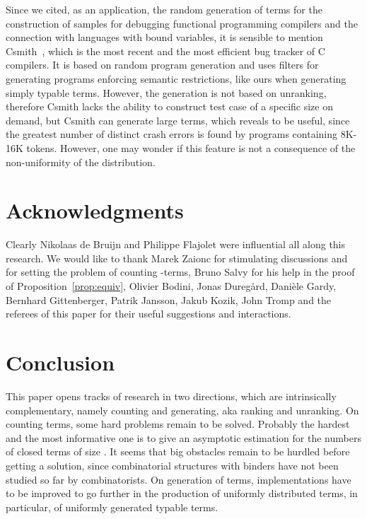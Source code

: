 \documentclass{jfp1}
\begin{document}
  Since we cited, as an application, the random generation of terms for the
  construction of samples for debugging functional programming compilers and the
  connection with languages with bound variables, it is sensible to mention
  \textsf{Csmith}~\cite{DBLP:conf/pldi/YangCER11}, which is the most recent and the
  most efficient bug tracker of C compilers.  It is based on random program
  generation and uses filters for generating programs enforcing semantic
  restrictions, like ours when generating simply typable terms.  However, the generation
  is not based on unranking, therefore \textsf{Csmith} lacks the ability to construct
  test case of a specific size on demand, but \textsf{Csmith} can generate large
  terms, which reveals to be useful, since the greatest number of distinct crash
  errors is found by programs containing 8K-16K tokens. However, one may wonder if
  this feature is not a consequence of the non-uniformity of the distribution.

\section{Acknowledgments}
\label{sec:acknowledgments}

Clearly Nikolaas de Bruijn and  Philippe Flajolet were influential all along this research.  We would like to
thank Marek Zaionc for stimulating discussions and for setting the problem of
counting -terms, Bruno Salvy for his help in the proof of
Proposition~\ref{prop:equiv}, Olivier Bodini, Jonas Dureg{\aa}rd, Dani\`{e}le Gardy,
Bernhard Gittenberger, Patrik Jansson, Jakub Kozik, John Tromp and the referees of this paper for
their useful suggestions and interactions.

\section{Conclusion}
\label{sec:conclusion}

This paper opens tracks of research in two directions, which are intrinsically
complementary, namely counting and generating, aka ranking and unranking. On counting terms, some hard problems
remain to be solved.  Probably the hardest and the most informative one is to
give an asymptotic estimation for the numbers of closed terms of size . It seems that big
obstacles remain to be hurdled before getting a solution, since combinatorial
structures with binders have not been studied so far by combinatorists.  On generation of
terms, implementations have to be improved to go further in the production of
uniformly distributed terms, in particular, of uniformly generated typable terms.  
\end{document}
